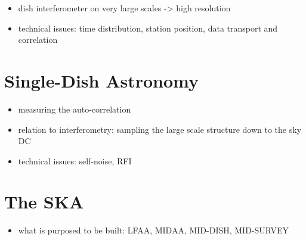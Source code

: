 \documentclass[usenatbib,usegraphicx]{article}
\begin{document}
\begin{itemize}
\item dish interferometer on very large scales -> high resolution
\item technical issues: time distribution, station position, data transport and correlation
\end{itemize}

\section{Single-Dish Astronomy}

\begin{itemize}
\item measuring the auto-correlation
\item relation to interferometry: sampling the large scale structure down to the sky DC
\item technical issues: self-noise, RFI
\end{itemize}

\section{The SKA}

\begin{itemize}
\item what is purposed to be built: LFAA, MIDAA, MID-DISH, MID-SURVEY
\end{itemize}

\label{lastpage}
\end{document}

